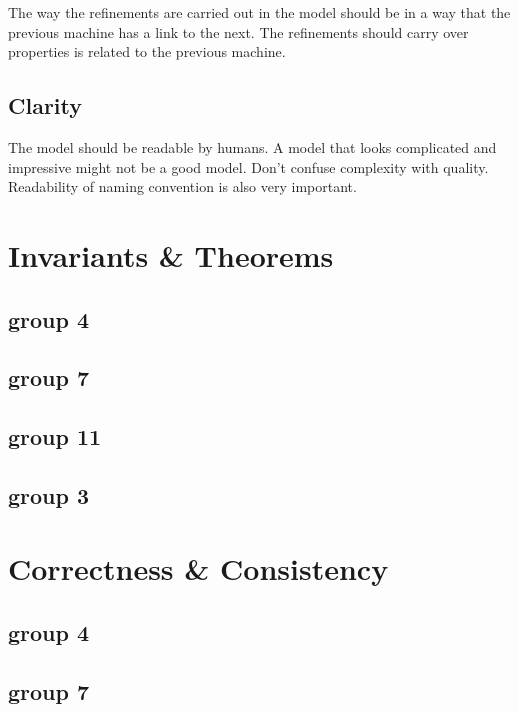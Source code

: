 The way the refinements are carried out in the model should be in a way that the previous machine has a link to the next. The refinements should carry over properties is related to the previous machine.

\subsection{Clarity}
\label{clarity}

The model should be readable by humans. A model that looks complicated and impressive might not be a good model. Don't confuse complexity with quality. Readability of naming convention is also very important.

\section{Invariants \& Theorems}
\label{invariantstheorems}

\subsection{group 4}
\label{group4}

\subsection{group 7}
\label{group7}

\subsection{group 11}
\label{group11}

\subsection{group 3}
\label{group3}

\section{Correctness \& Consistency}
\label{correctnessconsistency}

\subsection{group 4}
\label{group4}

\subsection{group 7}
\label{group7}

